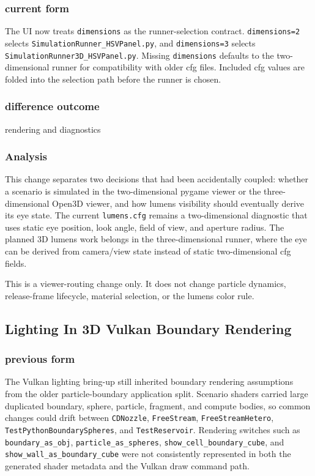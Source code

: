 \subsubsection{current form}

The UI now treats \texttt{dimensions} as the runner-selection contract.
\texttt{dimensions=2} selects \texttt{SimulationRunner\_HSVPanel.py}, and
\texttt{dimensions=3} selects \texttt{SimulationRunner3D\_HSVPanel.py}.
Missing \texttt{dimensions} defaults to the two-dimensional runner for
compatibility with older cfg files.  Included cfg values are folded into the
selection path before the runner is chosen.

\subsubsection{difference outcome}

rendering and diagnostics

\subsubsection{Analysis}

This change separates two decisions that had been accidentally coupled:
whether a scenario is simulated in the two-dimensional pygame viewer or the
three-dimensional Open3D viewer, and how lumens visibility should eventually
derive its eye state.  The current \texttt{lumens.cfg} remains a
two-dimensional diagnostic that uses static eye position, look angle, field
of view, and aperture radius.  The planned 3D lumens work belongs in the
three-dimensional runner, where the eye can be derived from camera/view state
instead of static two-dimensional cfg fields.

This is a viewer-routing change only.  It does not change particle dynamics,
release-frame lifecycle, material selection, or the lumens color rule.

\subsection{Lighting In 3D Vulkan Boundary Rendering}

\subsubsection{previous form}

The Vulkan lighting bring-up still inherited boundary rendering assumptions
from the older particle-boundary application split.  Scenario shaders carried
large duplicated boundary, sphere, particle, fragment, and compute bodies, so
common changes could drift between \texttt{CDNozzle}, \texttt{FreeStream},
\texttt{FreeStreamHetero}, \texttt{TestPythonBoundarySpheres}, and
\texttt{TestReservoir}.  Rendering switches such as
\texttt{boundary\_as\_obj}, \texttt{particle\_as\_spheres},
\texttt{show\_cell\_boundary\_cube}, and
\texttt{show\_wall\_as\_boundary\_cube} were not consistently represented in
both the generated shader metadata and the Vulkan draw command path.

